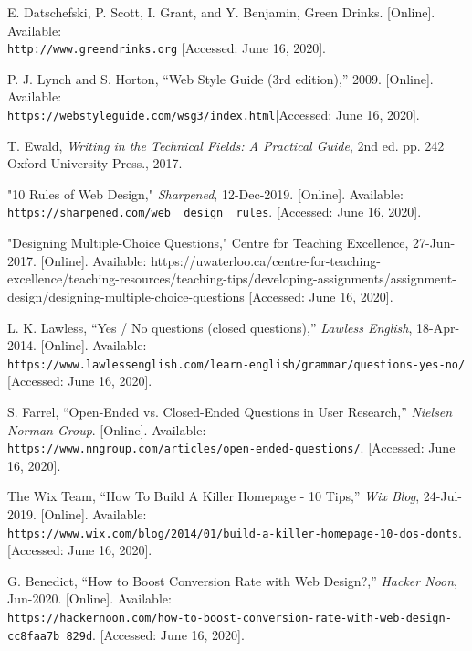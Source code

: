 \documentclass[12pt]{article}
\begin{document}
\begin{thebibliography}{9}

E. Datschefski, P. Scott, I. Grant, and Y. Benjamin, Green Drinks. [Online]. Available:	\\\texttt{http://www.greendrinks.org} [Accessed: June 16, 2020].

P. J. Lynch and S. Horton, “Web Style Guide (3rd edition),” 2009. [Online]. Available: \\\texttt {https://webstyleguide.com/wsg3/index.html}[Accessed: June 16, 2020].

T. Ewald,\textit{ Writing in the Technical Fields: A Practical Guide}, 2nd ed. pp. 242 Oxford University Press., 2017. 


 "10 Rules of Web Design," \textit{Sharpened}, 12-Dec-2019. [Online]. Available: \\\texttt{https://sharpened.com/web\_ design\_ rules}. [Accessed: June 16, 2020]. 
 
 
"Designing Multiple-Choice Questions," Centre for Teaching Excellence, 27-Jun-2017. [Online]. Available: https://uwaterloo.ca/centre-for-teaching-excellence/teaching-resources/teaching-tips/developing-assignments/assignment-design/designing-multiple-choice-questions [Accessed: June 16, 2020].


 L. K. Lawless, “Yes / No questions (closed questions),” \textit{Lawless English}, 18-Apr-2014. [Online]. Available: \\\texttt{https://www.lawlessenglish.com/learn-english/grammar/questions-yes-no/} [Accessed: June 16, 2020].
 
 S. Farrel, “Open-Ended vs. Closed-Ended Questions in User Research,” \textit{Nielsen Norman Group}. [Online]. Available: \\\texttt{https://www.nngroup.com/articles/open-ended-questions/}. [Accessed: June 16, 2020].
 
The Wix Team, “How To Build A Killer Homepage - 10 Tips,” \textit{Wix Blog}, 24-Jul-2019.
[Online]. Available:
\\\texttt{https://www.wix.com/blog/2014/01/build-a-killer-homepage-10-dos-donts}.
[Accessed: June 16, 2020].

G. Benedict, “How to Boost Conversion Rate with Web Design?,” \textit{Hacker Noon}, 
Jun-2020. [Online]. Available: 
\\\texttt{https://hackernoon.com/how-to-boost-conversion-rate-with-web-design-cc8faa7b
829d}. [Accessed: June 16, 2020].
	

\end{thebibliography}
\end{document}
